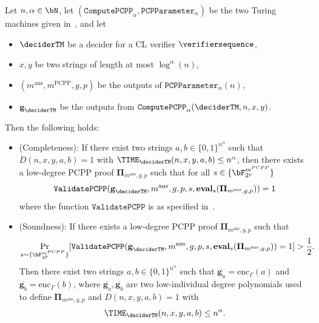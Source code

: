 \begin{theorem} \label{thm:classicalsoundnessPCPP}
	Let $n, \alpha \in \bN$, let $(\mathtt{ComputePCPP}_{\alpha}, \mathtt{PCPParameter}_{\alpha})$ be the two Turing machines given in~, and let
	\begin{itemize}
		\item $\deciderTM$ be a decider for a CL verifier $\verifiersequence$,
		\item $x,y$ be two strings of length at most $\log^{\alpha}(n)$,
		\item $(m^{\text{ans}},m^{\text{PCPP}}, g,p)$ be the outputs of $\mathtt{PCPParameter}_{\alpha}(n)$,
		\item $\textbf{g}_{\deciderTM}$ be the outputs from $\mathtt{ComputePCPP}_{\alpha}(\deciderTM,n, x,y)$. 
	\end{itemize}
	Then the following holds:
	\begin{itemize}
		\item (Completeness): If there exist two strings $a,b \in \{0,1\}^{n^{\alpha}}$ such that $D(n,x,y,a,b) = 1$ with $\TIME_{\deciderTM}(n,x,y,a,b) \leq n^{\alpha}$, then there exists a low-degree PCPP proof $\mathbf{\Pi}_{m^{\text{ans}},g, p}$ such that for all $s \in \{\bF_{2^p}^{m^{PCPP}}\}$
		\begin{equation*}
			\mathtt{ValidatePCPP}(\textbf{g}_{\deciderTM}, m^{\text{ans}},g, p, s, \textbf{eval}_s(\mathbf{\Pi}_{m^{\text{ans}},g, p})) = 1
		\end{equation*}
		where the function $\mathtt{ValidatePCPP}$ is as specified in~. 
		\item (Soundness): If there exists a low-degree PCPP proof $\mathbf{\Pi}_{m^{\text{ans}},g, p}$ such that 
		\begin{equation}
			\Pr_{s \sim \{\bF_{2^p}^{m^{PCPP}} \}}[	\mathtt{ValidatePCPP}(\textbf{g}_{\deciderTM}, m^{\text{ans}},g, p, s, \textbf{eval}_s(\mathbf{\Pi}_{m^{\text{ans}},g, p})) = 1] > \frac{1}{2}.
		\end{equation}
		Then there exist two strings $a,b \in \{0,1\}^{n^{\alpha}}$ such that $\overline{\textbf{g}_a} =  \text{enc}_{\Gamma}(a)$ and $\overline{\textbf{g}_b} =  \text{enc}_{\Gamma}(b)$, where $\overline{\textbf{g}_a}, \overline{\textbf{g}_b}$ are two low-individual degree polynomials used to define $\mathbf{\Pi}_{m^{\text{ans}},g, p}$ and $D(n,x,y,a,b) = 1$ with 
		\begin{equation*}
			\TIME_{\deciderTM}(n,x,y,a,b) \leq n^{\alpha}. 
		\end{equation*}
		
	\end{itemize}
\end{theorem}

